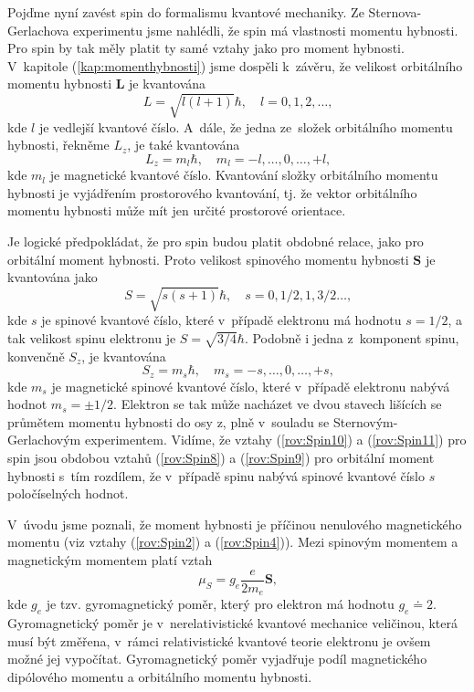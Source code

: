 Pojďme nyní zavést spin do formalismu kvantové mechaniky. Ze Sternova-Gerlachova experimentu jsme nahlédli, že spin má vlastnosti momentu hybnosti. Pro spin by tak měly platit ty samé vztahy jako pro moment hybnosti. V~kapitole (\ref{kap:momenthybnosti}) jsme dospěli k~závěru, že velikost orbitálního momentu hybnosti $\mathbf{L}$ je kvantována 
\begin{equation}
L = \sqrt{l(l+1)}\hbar, \quad l=0,1,2,\dots \mbox{,}
\label{rov:Spin8}
\end{equation}
kde $l$ je vedlejší kvantové číslo. A~dále, že jedna ze~složek orbitálního momentu hybnosti, řekněme $L_z$, je také kvantována
\begin{equation}
L_z = m_l \hbar, \quad m_l=-l,\dots, 0, \dots, +l \mbox{,}
\label{rov:Spin9}
\end{equation}
kde $m_l$ je magnetické kvantové číslo. Kvantování složky orbitálního momentu hybnosti je vyjádřením prostorového kvantování, tj. že vektor orbitálního momentu hybnosti může mít jen určité prostorové orientace.

Je logické předpokládat, že pro spin budou platit obdobné relace, jako pro orbitální moment hybnosti. Proto velikost spinového momentu hybnosti $\mathbf{S}$ je kvantována jako
\begin{equation}
\boxed{S = \sqrt{s(s+1)}\hbar, \quad s=0,1/2,1,3/2 \dots \mbox{,}}
\label{rov:Spin10}
\end{equation}
kde $s$ je spinové kvantové číslo, které v~případě elektronu má hodnotu $s=1/2$, a tak velikost spinu elektronu je $S = \sqrt{3/4}\hbar$. Podobně i jedna z~komponent spinu, konvenčně $S_z$, je kvantována
\begin{equation}
\boxed{S_z = m_s \hbar, \quad m_s= -s, \dots, 0, \dots, +s \mbox{,}}
\label{rov:Spin11}
\end{equation}
kde $m_s$ je magnetické spinové kvantové číslo, které v~případě elektronu nabývá hodnot $m_s=\pm 1/2$. Elektron se tak může nacházet ve dvou stavech lišících se průmětem momentu hybnosti do osy z, plně v~souladu se Sternovým-Gerlachovým experimentem. Vidíme, že vztahy (\ref{rov:Spin10}) a (\ref{rov:Spin11}) pro spin jsou obdobou vztahů (\ref{rov:Spin8}) a (\ref{rov:Spin9}) pro orbitální moment hybnosti s~tím rozdílem, že v~případě spinu nabývá spinové kvantové číslo $s$ poločíselných hodnot. 

V~úvodu jsme poznali, že moment hybnosti je příčinou nenulového magnetického momentu (viz vztahy (\ref{rov:Spin2}) a (\ref{rov:Spin4})). Mezi spinovým momentem a magnetickým momentem platí vztah
\begin{equation}
\boxed{\mu_S = g_e \frac{e}{2m_e}\mathbf{S} \mbox{,}}
\label{rov:Spin12}
\end{equation}
kde $g_e$ je tzv. gyromagnetický poměr, který pro elektron má hodnotu $g_e\doteq2$. Gyromagnetický poměr je v~nerelativistické kvantové mechanice veličinou, která musí být změřena, v~rámci relativistické kvantové teorie elektronu je ovšem možné jej vypočítat. Gyromagnetický poměr vyjadřuje podíl magnetického dipólového momentu a orbitálního momentu hybnosti.

